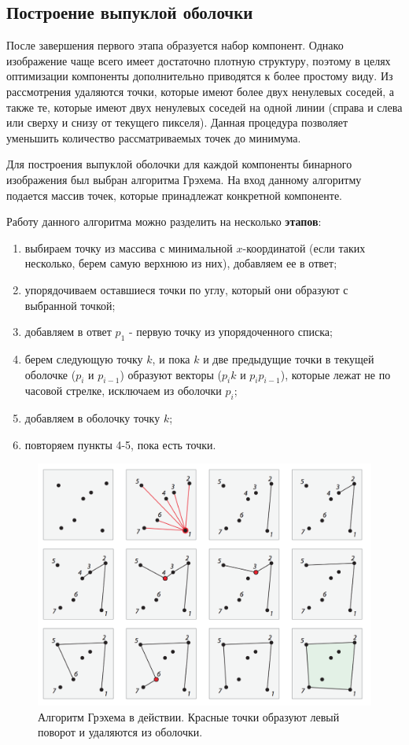 \documentclass[a4paper, 12pt]{extarticle}
\newcommand{\n}{\par}
\begin{document}
	\subsection{Построение выпуклой оболочки}
	После завершения первого этапа образуется набор компонент. Однако изображение чаще всего имеет достаточно плотную структуру, поэтому в целях оптимизации компоненты дополнительно приводятся к более простому виду. Из рассмотрения удаляются точки, которые имеют более двух ненулевых соседей, а также те, которые имеют двух ненулевых соседей на одной линии (справа и слева или сверху и снизу от текущего пикселя). Данная процедура позволяет уменьшить количество рассматриваемых точек до минимума.\n
	Для построения выпуклой оболочки для каждой компоненты бинарного изображения был выбран алгоритма Грэхема. На вход данному алгоритму подается массив точек, которые принадлежат конкретной компоненте.\n
	Работу данного алгоритма можно разделить на несколько \textbf{этапов}:
	\begin{enumerate}
		\item выбираем точку из массива с минимальной $x$-координатой (если таких несколько, берем самую верхнюю из них), добавляем ее в ответ;
		\item упорядочиваем оставшиеся точки по углу, который они образуют с выбранной точкой;
		\item добавляем в ответ $p_1$ - первую точку из упорядоченного списка;
		\item берем следующую точку $k$, и пока $k$ и две предыдущие точки в текущей оболочке ($p_i$ и $p_{i-1}$) образуют векторы ($p_i$$k$ и $p_i$$p_{i-1}$), которые лежат не по часовой стрелке, исключаем из оболочки $p_i$;
		\item добавляем в оболочку точку $k$;
		\item повторяем пункты 4-5, пока есть точки.
	\end{enumerate}
	\begin{figure}[h]
		\centering
		\includegraphics[width=\linewidth]{img/graham}
		\caption{Алгоритм Грэхема в действии. Красные точки образуют левый поворот и удаляются из оболочки.}
		\label{fig:graham}
	\end{figure}
	\newpage
\end{document}
